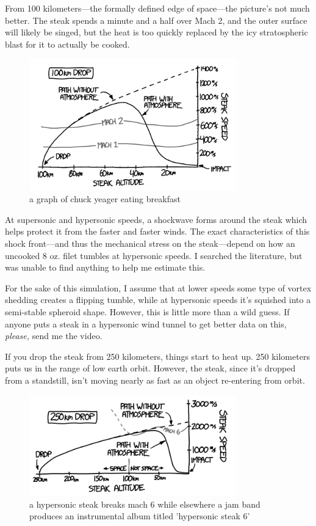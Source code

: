 {From 100 kilometers—the formally defined edge of space—the picture’s not much better. The steak spends a minute and a half over Mach 2, and the outer surface will likely be singed, but the heat is too quickly replaced by the icy stratospheric blast for it to actually be cooked.}

\begin{figure}[!htbp]
\centering
\includegraphics[scale=0.5, max width=0.8\textwidth]{imgs/a/28/steak_100km.png}
\caption{a graph of chuck yeager eating breakfast}
\end{figure}

{At supersonic and hypersonic speeds, a shockwave forms around the steak which helps protect it from the faster and faster winds. The exact characteristics of this shock front—and thus the mechanical stress on the steak—depend on how an uncooked 8 oz. filet tumbles at hypersonic speeds. I searched the literature, but was unable to find anything to help me estimate this.}

{For the sake of this simulation, I assume that at lower speeds some type of vortex shedding creates a flipping tumble, while at hypersonic speeds it’s squished into a semi-stable spheroid shape. However, this is little more than a wild guess. If anyone puts a steak in a hypersonic wind tunnel to get better data on this, \emph{please,} send me the video.}

{If you drop the steak from 250 kilometers, things start to heat up. 250 kilometers puts us in the range of low earth orbit. However, the steak, since it’s dropped from a standstill, isn’t moving nearly as fast as an object re-entering from orbit.}

\begin{figure}[!htbp]
\centering
\includegraphics[scale=0.5, max width=0.8\textwidth]{imgs/a/28/steak_250km.png}
\caption{a hypersonic steak breaks mach 6 while elsewhere a jam band produces an instrumental album titled 'hypersonic steak 6'}
\end{figure}

